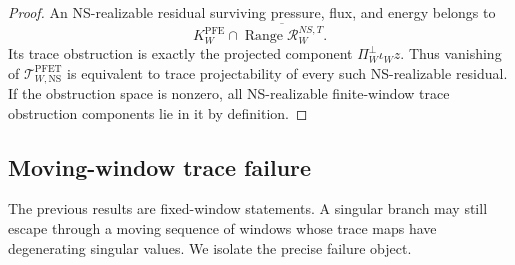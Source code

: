 \documentclass[11pt]{article}
\numberwithin{equation}{section}
\theoremstyle{plain}
\theoremstyle{definition}
\theoremstyle{remark}
\newcommand{\NS}{\mathrm{NS}}
\newcommand{\PFE}{\mathrm{PFE}}
\newcommand{\PFET}{\mathrm{PFET}}
\begin{document}
\begin{proof}
An NS-realizable residual surviving pressure, flux, and energy belongs to
\[
K_W^{\PFE}\cap\overline{\operatorname{Range}\mathcal R_W^{NS,T}}.
\]
Its trace obstruction is exactly the projected component
\(\Pi_W^\perp\iota_Wz\).  Thus vanishing of
\(\mathcal T_{W,\NS}^{\PFET}\) is equivalent to trace projectability of every
such NS-realizable residual.  If the obstruction space is nonzero, all
NS-realizable finite-window trace obstruction components lie in it by
definition.
\end{proof}

\subsection{Moving-window trace failure}

The previous results are fixed-window statements.  A singular branch may still
escape through a moving sequence of windows whose trace maps have degenerating
singular values.  We isolate the precise failure object.
\end{document}
